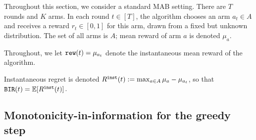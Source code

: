 
\newcommand{\ExplorExploit}{\term{ExplorExploit}}
\newcommand{\PhasedExplorExploit}{\term{PhasedExplorExploit}}
\newcommand{\SuccesiveEliminationReset}{\term{SuccesiveEliminationReset}}

\newcommand{\IReg}{R^{\term{inst}}} %





Throughout this section, we consider a standard MAB setting. There are $T$ rounds and $K$ arms. In each round $t\in [T]$, the algorithm chooses an arm $a_t\in A$ and receives a reward $r_t\in[0,1]$ for this arm, drawn from a fixed but unknown distribution. The set of all arms is $A$; mean reward of arm $a$ is denoted $\mu_a$. 

Throughout, we let
    $\mathtt{rew}(t) = \mu_{a_t}$
denote the instantaneous mean reward of the algorithm.

Instantaneous regret is denoted
    $\IReg(t) := \max_{a\in A} \mu_a - \mu_{a_t}$,
so that 
    $\BIR(t) = \E[\IReg(t)]$.

\subsection{Monotonicity-in-information for the greedy step}
\label{sec:MAB-greedy}


